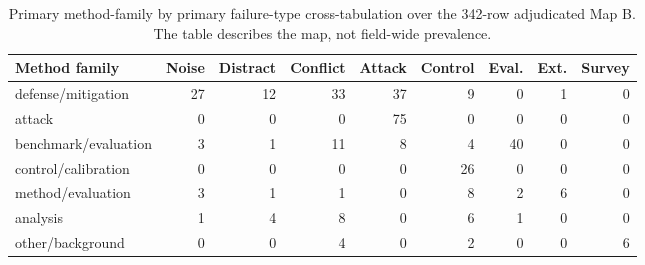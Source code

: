 \begin{table}[t]
\centering
\scriptsize
\begin{tabular}{lrrrrrrrr}
\toprule
\textbf{Method family} & Noise & Distract & Conflict & Attack & Control & Eval. & Ext. & Survey \\ 
\midrule
defense/mitigation & 27 & 12 & 33 & 37 & 9 & 0 & 1 & 0 \\ 
attack & 0 & 0 & 0 & 75 & 0 & 0 & 0 & 0 \\ 
benchmark/evaluation & 3 & 1 & 11 & 8 & 4 & 40 & 0 & 0 \\ 
control/calibration & 0 & 0 & 0 & 0 & 26 & 0 & 0 & 0 \\ 
method/evaluation & 3 & 1 & 1 & 0 & 8 & 2 & 6 & 0 \\ 
analysis & 1 & 4 & 8 & 0 & 6 & 1 & 0 & 0 \\ 
other/background & 0 & 0 & 4 & 0 & 2 & 0 & 0 & 6 \\ 
\bottomrule
\end{tabular}
\caption{Primary method-family by primary failure-type cross-tabulation over the 342-row adjudicated Map B. The table describes the map, not field-wide prevalence.}
\label{tab:method-failure-crosstab}
\end{table}
